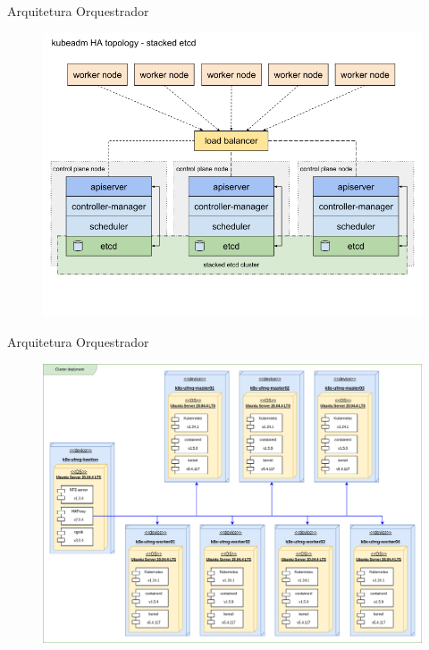 \documentclass[10pt,brazil]{beamer}
\theoremstyle{definition}
\begin{document}
\begin{frame}{Arquitetura Orquestrador}
\begin{figure}
    \centering
    \includegraphics[width=1\textwidth]{kubeadm-ha-topology-stacked-etcd.png}
    \label{fig:k8s-arch}
\end{figure}
\end{frame}

\begin{frame}{Arquitetura Orquestrador}
  \begin{figure}
      \centering
      \includegraphics[width=.9\textwidth]{TCC - Kubenertes-Cluster Deplyment.drawio.png}
      \label{fig:k8s-arch-deploy}
  \end{figure}
  \end{frame}
\end{document}
